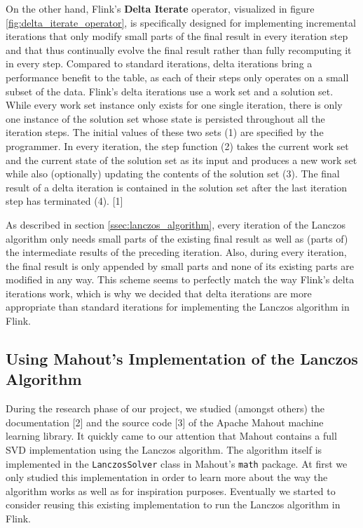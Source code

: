 On the other hand, Flink's \textbf{Delta Iterate} operator, visualized in
figure \ref{fig:delta_iterate_operator}, is specifically designed for
implementing incremental iterations that only modify small parts of the final
result in every iteration step and that thus continually evolve the final
result rather than fully recomputing it in every step. Compared to standard
iterations, delta iterations bring a performance benefit to the table, as each
of their steps only operates on a small subset of the data. Flink's delta
iterations use a work set and a solution set. While every work set instance
only exists for one single iteration, there is only one instance of the
solution set whose state is persisted throughout all the iteration steps. The
initial values of these two sets (1) are specified by the programmer. In every
iteration, the step function (2) takes the current work set and the current
state of the solution set as its input and produces a new work set while also
(optionally) updating the contents of the solution set (3). The final result of
a delta iteration is contained in the solution set after the last iteration
step has terminated (4). [1]


As described in section \ref{ssec:lanczos_algorithm}, every iteration of the
Lanczos algorithm only needs small parts of the existing final result as well
as (parts of) the intermediate results of the preceding iteration. Also, during
every iteration, the final result is only appended by small parts and none of
its existing parts are modified in any way. This scheme seems to perfectly
match the way Flink's delta iterations work, which is why we decided that delta
iterations are more appropriate than standard iterations for implementing the
Lanczos algorithm in Flink.



\subsection{Using Mahout's Implementation of the Lanczos Algorithm}
\label{ssec:approach_mahout}
During the research phase of our project, we studied (amongst others) the
documentation [2] and the source code [3] of the Apache Mahout machine learning
library. It quickly came to our attention that Mahout contains a full SVD
implementation using the Lanczos algorithm. The algorithm itself is implemented
in the \texttt{LanczosSolver} class in Mahout's \texttt{math} package. At first
we only studied this implementation in order to learn more about the way the
algorithm works as well as for inspiration purposes. Eventually we started to
consider reusing this existing implementation to run the Lanczos algorithm in
Flink.


